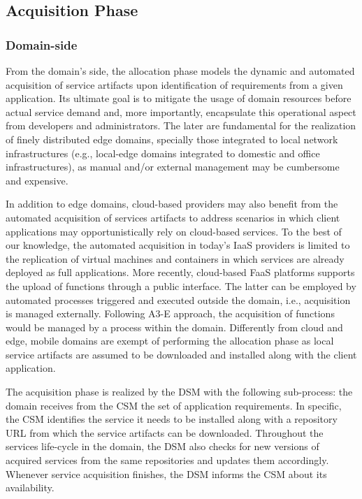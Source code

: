 \subsection{Acquisition Phase}\label{sec:A3-E-acquisition}


\subsubsection*{Domain-side} From the domain's side, the allocation phase models the dynamic and automated acquisition of service artifacts upon identification of requirements from a given application. Its ultimate goal is to mitigate the usage of domain resources before actual service demand and, more importantly, encapsulate this operational aspect from developers and administrators. The later are fundamental for the realization of finely distributed edge domains, specially those integrated to local network infrastructures (e.g., local-edge domains integrated to domestic and office infrastructures), as manual and/or external management may be cumbersome and expensive.

In addition to edge domains, cloud-based providers may also benefit from the automated acquisition of services artifacts to address scenarios in which client applications may opportunistically rely on cloud-based services. To the best of our knowledge, the automated acquisition in today's IaaS providers is limited to the replication of virtual machines and containers in which services are already deployed as full applications. More recently, cloud-based FaaS platforms supports the upload of functions through a public interface. The latter can be employed by automated processes triggered and executed outside the domain, i.e., acquisition is managed externally. Following A3-E approach, the acquisition of functions would be managed by a process within the domain. Differently from cloud and edge, mobile domains are exempt of performing the allocation phase as local service artifacts are assumed to be downloaded and installed along with the client application.

The acquisition phase is realized by the DSM with the following sub-process: the domain receives from the CSM the set of application requirements. In specific, the CSM identifies the service it needs to be installed along with a repository URL from which the service artifacts can be downloaded. Throughout the services life-cycle in the domain, the DSM also checks for new versions of acquired services from the same repositories and updates them accordingly. Whenever service acquisition finishes, the DSM informs the CSM about its availability.

